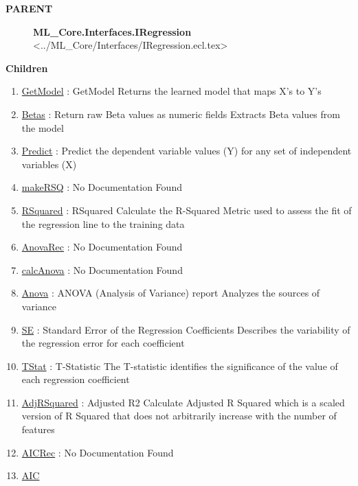 \par
\begin{description}
\item [\colorbox{tagtype}{\color{white} \textbf{\textsf{PARENT}}}] \textbf{ML\_Core.Interfaces.IRegression} <../ML\_Core/Interfaces/IRegression.ecl.tex>
\end{description}


\textbf{Children}
\begin{enumerate}
\item \hyperlink{ecldoc:linearregression.ols.getmodel}{GetModel}
: GetModel Returns the learned model that maps X's to Y's
\item \hyperlink{ecldoc:linearregression.ols.betas}{Betas}
: Return raw Beta values as numeric fields Extracts Beta values from the model
\item \hyperlink{ecldoc:linearregression.ols.predict}{Predict}
: Predict the dependent variable values (Y) for any set of independent variables (X)
\item \hyperlink{ecldoc:linearregression.ols.makersq}{makeRSQ}
: No Documentation Found
\item \hyperlink{ecldoc:linearregression.ols.rsquared}{RSquared}
: RSquared Calculate the R-Squared Metric used to assess the fit of the regression line to the training data
\item \hyperlink{ecldoc:linearregression.ols.anovarec}{AnovaRec}
: No Documentation Found
\item \hyperlink{ecldoc:linearregression.ols.calcanova}{calcAnova}
: No Documentation Found
\item \hyperlink{ecldoc:linearregression.ols.anova}{Anova}
: ANOVA (Analysis of Variance) report Analyzes the sources of variance
\item \hyperlink{ecldoc:linearregression.ols.se}{SE}
: Standard Error of the Regression Coefficients Describes the variability of the regression error for each coefficient
\item \hyperlink{ecldoc:linearregression.ols.tstat}{TStat}
: T-Statistic The T-statistic identifies the significance of the value of each regression coefficient
\item \hyperlink{ecldoc:linearregression.ols.adjrsquared}{AdjRSquared}
: Adjusted R2 Calculate Adjusted R Squared which is a scaled version of R Squared that does not arbitrarily increase with the number of features
\item \hyperlink{ecldoc:linearregression.ols.aicrec}{AICRec}
: No Documentation Found
\item \hyperlink{ecldoc:linearregression.ols.aic}{AIC}

\end{enumerate}

